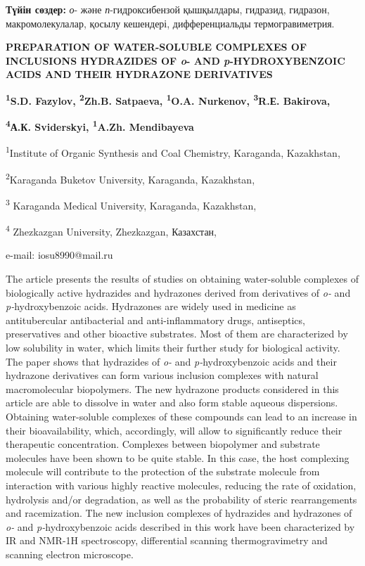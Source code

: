 {\bfseries Түйін сөздер:} \emph{о}- және \emph{п}-гидроксибензой
қышқылдары, гидразид, гидразон, макромолекулалар, қосылу кешендері,
дифференциальды термогравиметрия.

{\bfseries PREPARATION OF WATER-SOLUBLE COMPLEXES OF INCLUSIONS HYDRAZIDES
OF \emph{o}- AND \emph{p}-HYDROXYBENZOIC ACIDS AND THEIR HYDRAZONE
DERIVATIVES}

{\bfseries \textsuperscript{1}S.D. Fazylov, \textsuperscript{2}Zh.B.
Satpaeva, \textsuperscript{1}O.A. Nurkenov, \textsuperscript{3}R.Е.
Bakirova,}

{\bfseries \textsuperscript{4}А.К. Sviderskyi, \textsuperscript{1}A.Zh.
Mendibayeva}

\textsuperscript{1}Institute of Organic Synthesis and Coal Chemistry,
Karaganda, Kazakhstan,

\textsuperscript{2}Karaganda Buketov University, Karaganda, Kazakhstan,

\textsuperscript{3} Karaganda Medical University, Karaganda, Kazakhstan,

\textsuperscript{4} Zhezkazgan University, Zhezkazgan, Казахстан,

e-mail: iosu8990@mail.ru

The article presents the results of studies on obtaining water-soluble
complexes of biologically active hydrazides and hydrazones derived from
derivatives of \emph{o-} and \emph{p-}hydroxybenzoic acids. Hydrazones
are widely used in medicine as antitubercular antibacterial and
anti-inflammatory drugs, antiseptics, preservatives and other bioactive
substrates. Most of them are characterized by low solubility in water,
which limits their further study for biological activity. The paper
shows that hydrazides of \emph{o-} and \emph{p-}hydroxybenzoic acids and
their hydrazone derivatives can form various inclusion complexes with
natural macromolecular biopolymers. The new hydrazone products
considered in this article are able to dissolve in water and also form
stable aqueous dispersions. Obtaining water-soluble complexes of these
compounds can lead to an increase in their bioavailability, which,
accordingly, will allow to significantly reduce their therapeutic
concentration. Complexes between biopolymer and substrate molecules have
been shown to be quite stable. In this case, the host complexing
molecule will contribute to the protection of the substrate molecule
from interaction with various highly reactive molecules, reducing the
rate of oxidation, hydrolysis and/or degradation, as well as the
probability of steric rearrangements and racemization. The new inclusion
complexes of hydrazides and hydrazones of \emph{o-} and
\emph{p-}hydroxybenzoic acids described in this work have been
characterized by IR and NMR-1H spectroscopy, differential scanning
thermogravimetry and scanning electron microscope.

